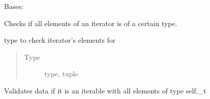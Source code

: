 \documentclass[letterpaper,10pt,english]{sphinxmanual}
\begin{document}
\begin{fulllineitems}
\label{\detokenize{dalio.validator:dalio.validator.base_val.ELEMS_TYPE}}
Bases: {\hyperref[\detokenize{dalio.validator:dalio.validator.base_val.HAS_ATTR}]{}}

Checks if all elements of an iterator is of a certain type.

\begin{fulllineitems}
\label{\detokenize{dalio.validator:dalio.validator.base_val.ELEMS_TYPE._t}}
type to check iterator’s elements for
\begin{quote}\begin{description}
\item[{Type}] \leavevmode
type, tuple

\end{description}\end{quote}

\end{fulllineitems}


\begin{fulllineitems}
\label{\detokenize{dalio.validator:dalio.validator.base_val.ELEMS_TYPE.validate}}
Validates data if it is an iterable with all elements of type
self.\_t

\end{fulllineitems}


\end{fulllineitems}

\end{document}
